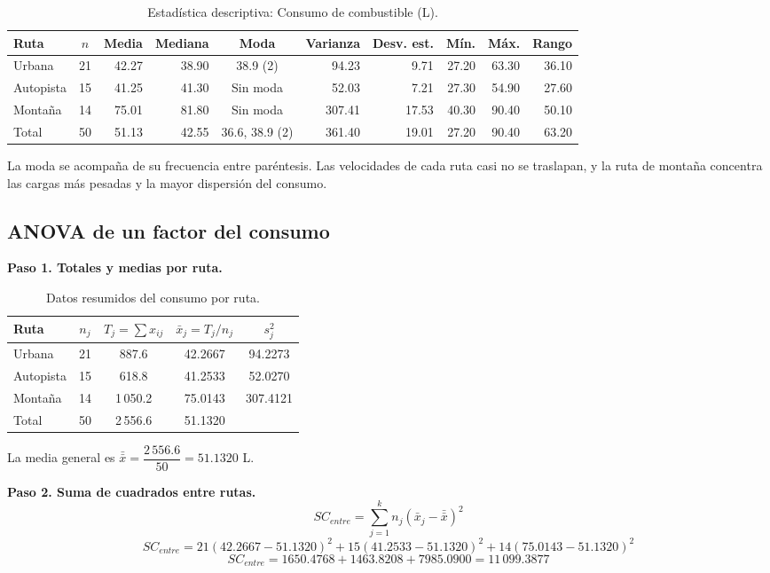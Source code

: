\documentclass[12pt,letterpaper]{article}
\newcommand{\paren}[1]{\left(#1\right)}
\begin{document}
\begin{table}[H]
\centering
\caption{Estadística descriptiva: Consumo de combustible (L).}
\small\setlength{\tabcolsep}{4.5pt}
\begin{tabular}{lcrrcrrrrr}
\toprule
Ruta & $n$ & Media & Mediana & Moda & Varianza & Desv. est. & Mín. & Máx. & Rango \\
\midrule
Urbana & 21 & 42.27 & 38.90 & 38.9 (2) & 94.23 & 9.71 & 27.20 & 63.30 & 36.10 \\
Autopista & 15 & 41.25 & 41.30 & Sin moda & 52.03 & 7.21 & 27.30 & 54.90 & 27.60 \\
Montaña & 14 & 75.01 & 81.80 & Sin moda & 307.41 & 17.53 & 40.30 & 90.40 & 50.10 \\
\midrule
Total & 50 & 51.13 & 42.55 & 36.6, 38.9 (2) & 361.40 & 19.01 & 27.20 & 90.40 & 63.20 \\
\bottomrule
\end{tabular}
\end{table}

La moda se acompaña de su frecuencia entre paréntesis. Las velocidades de cada ruta casi no se traslapan, y la ruta de montaña concentra las cargas más pesadas y la mayor dispersión del consumo.

\subsection{ANOVA de un factor del consumo}

\textbf{Paso 1. Totales y medias por ruta.}

\begin{table}[H]
\centering
\caption{Datos resumidos del consumo por ruta.}
\begin{tabular}{lcccc}
\toprule
Ruta & $n_j$ & $T_j = \sum x_{ij}$ & $\bar{x}_j = T_j / n_j$ & $s_j^2$ \\
\midrule
Urbana & 21 & 887.6 & 42.2667 & 94.2273 \\
Autopista & 15 & 618.8 & 41.2533 & 52.0270 \\
Montaña & 14 & 1\,050.2 & 75.0143 & 307.4121 \\
\midrule
Total & 50 & 2\,556.6 & 51.1320 & \\
\bottomrule
\end{tabular}
\end{table}

La media general es $\bar{\bar{x}} = \dfrac{2\,556.6}{50} = 51.1320$ L.

\textbf{Paso 2. Suma de cuadrados entre rutas.}
$$ SC_{entre} = \sum_{j=1}^{k} n_j \paren{\bar{x}_j - \bar{\bar{x}}}^2 $$
$$ SC_{entre} = 21\paren{42.2667 - 51.1320}^2 + 15\paren{41.2533 - 51.1320}^2 + 14\paren{75.0143 - 51.1320}^2 $$
$$ SC_{entre} = 1650.4768 + 1463.8208 + 7985.0900 = 11\,099.3877 $$
\end{document}
